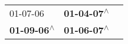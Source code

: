 \begin{supertabular}{lll}
                  01-07-06\textsuperscript{} &  \textbf{01-04-07\textsuperscript{$\wedge$}} \\
 \textbf{01-09-06\textsuperscript{$\wedge$}} &  \textbf{01-06-07\textsuperscript{$\wedge$}} \\
\end{supertabular}
